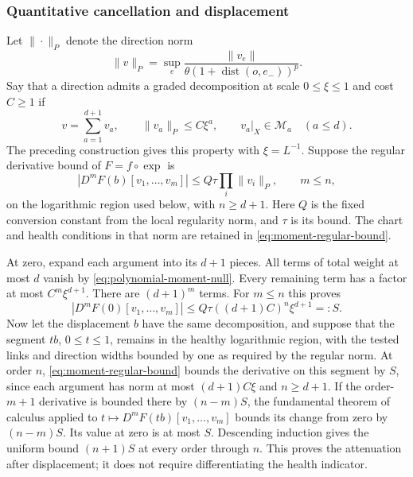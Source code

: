 \subsubsection{Quantitative cancellation and displacement}
Let $\|\cdot\|_P$ denote the direction norm
\[
 \|v\|_P=\sup_e
 \frac{\|v_e\|}{\theta(1+\operatorname{dist}(o,e_-))^p}.
\]
Say that a direction admits a graded decomposition at scale
$0\le\xi\le1$ and cost $C\ge1$ if
\[
 v=\sum_{a=1}^{d+1}v_a,\qquad
 \|v_a\|_P\le C\xi^a,\qquad
                   v_a|_X\in\mathcal M_a\quad(a\le d).
\]
The preceding construction gives this property with $\xi=L^{-1}$.
Suppose the regular derivative bound of $F=f\circ\exp$ is
\begin{equation}\label{eq:moment-regular-bound}
 |D^mF(b)[v_1,\ldots,v_m]|
           \le Q\tau\prod_i\|v_i\|_P,
                                      \qquad m\le n,
\end{equation}
on the logarithmic region used below, with $n\ge d+1$.
Here $Q$ is the fixed conversion constant from the local
regularity norm, and $\tau$ is its bound. The chart and health
conditions in that norm are retained in
\eqref{eq:moment-regular-bound}.

At zero, expand each argument into its $d+1$ pieces. All terms
of total weight at most $d$ vanish by
\eqref{eq:polynomial-moment-null}. Every remaining term has a
factor at most $C^m\xi^{d+1}$. There are $(d+1)^m$ terms.
For $m\le n$ this proves
\[
 |D^mF(0)[v_1,\ldots,v_m]|
             \le Q\tau((d+1)C)^n\xi^{d+1}=:S.
\]
Now let the displacement $b$ have the same decomposition, and
suppose that the segment $tb$, $0\le t\le1$, remains in the
healthy logarithmic region, with the tested links and direction
widths bounded by one as required by the regular norm. At order
$n$, \eqref{eq:moment-regular-bound} bounds the derivative on
this segment by $S$, since each argument has norm at most
$(d+1)C\xi$ and $n\ge d+1$. If the order-$m+1$ derivative is
bounded there by $(n-m)S$, the fundamental theorem of calculus
applied to $t\mapsto D^mF(tb)[v_1,\ldots,v_m]$ bounds its
change from zero by $(n-m)S$. Its value at zero is at most $S$.
Descending induction gives the uniform bound $(n+1)S$ at every
order through $n$. This proves the attenuation after displacement;
it does not require differentiating the health indicator.
